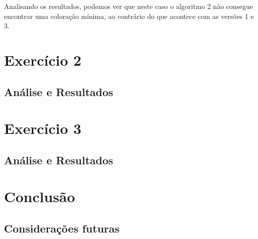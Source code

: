 \documentclass[a4paper,12pt]{report}
\begin{document}
Analisando os resultados, podemos ver que neste caso o algoritmo 2 não consegue encontrar uma coloração mínima, ao contrário do que acontece com as versões 1 e 3.


\chapter{Exercício 2}

\section{Análise e Resultados}

\chapter{Exercício 3}

\section{Análise e Resultados}

\chapter{Conclusão}

\section{Considerações futuras}
\end{document}
